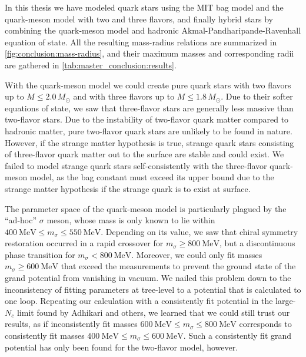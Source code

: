 In this thesis we have modeled quark stars using the MIT bag model and the quark-meson model with two and three flavors,
and finally hybrid stars by combining the quark-meson model and hadronic Akmal-Pandharipande-Ravenhall equation of state.
All the resulting mass-radius relations are summarized in \cref{fig:conclusion:mass-radius},
and their maximum masses and corresponding radii are gathered in \cref{tab:master_conclusion:results}.

With the quark-meson model we could create pure quark stars with two flavors up to $M \leq 2.0 \, M_\odot$ and with three flavors up to $M \leq 1.8 \, M_\odot$.
Due to their softer equations of state, we saw that three-flavor stars are generally less massive than two-flavor stars.
Due to the instability of two-flavor quark matter compared to hadronic matter,
pure two-flavor quark stars are unlikely to be found in nature.
However, if the strange matter hypothesis is true,
strange quark stars consisting of three-flavor quark matter out to the surface are stable and could exist.
We failed to model strange quark stars self-consistently with the three-flavor quark-meson model,
as the bag constant must exceed its upper bound due to the strange matter hypothesis if the strange quark is to exist at surface.

The parameter space of the quark-meson model is particularly plagued by the ``ad-hoc'' $\sigma$ meson,
whose mass is only known to lie within $\SI{400}{\mega\electronvolt} \leq m_\sigma \leq \SI{550}{\mega\electronvolt}$.
Depending on its value, we saw that chiral symmetry restoration occurred in a rapid crossover for $m_\sigma \geq \SI{800}{\mega\electronvolt}$,
but a discontinuous phase transition for $m_\sigma < \SI{800}{\mega\electronvolt}$.
Moreover, we could only fit masses $m_\sigma \geq \SI{600}{\mega\electronvolt}$ that exceed the measurements
to prevent the ground state of the grand potential from vanishing in vacuum.
We nailed this problem down to the inconsistency of fitting parameters at tree-level to a potential that is calculated to one loop.
Repeating our calculation with a consistently fit potential in the large-$N_c$ limit found by Adhikari and others,
we learned that we could still trust our results,
as if inconsistently fit masses $\SI{600}{\mega\electronvolt} \leq m_\sigma \leq \SI{800}{\mega\electronvolt}$
corresponds to consistently fit masses $\SI{400}{\mega\electronvolt} \leq m_\sigma \leq \SI{600}{\mega\electronvolt}$.
Such a consistently fit grand potential has only been found for the two-flavor model, however.

